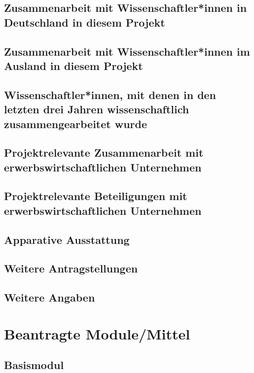 \documentclass[de]{dfg-proposal}
\begin{document}
\subsection{Zusammenarbeit mit Wissenschaftler*innen in Deutschland in diesem Projekt}

\subsection{Zusammenarbeit mit Wissenschaftler*innen im Ausland in diesem Projekt}

\subsection{Wissenschaftler*innen, mit denen in den letzten drei Jahren wissenschaftlich zusammengearbeitet wurde}

\subsection{Projektrelevante Zusammenarbeit mit erwerbswirtschaftlichen Unternehmen}

\subsection{Projektrelevante Beteiligungen mit erwerbswirtschaftlichen Unternehmen}

\subsection{Apparative Ausstattung}

\subsection{Weitere Antragstellungen}

\subsection{Weitere Angaben}

\pagebreak

\section{Beantragte Module/Mittel}\label{sec:beantragte-module/mittel}

\subsection{Basismodul}
\end{document}
